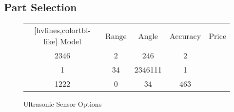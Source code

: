 \subsection{Part Selection}


\begin{figure}[h]
	\centering
	\setlength{\tabcolsep}{11pt} %
	\renewcommand{\arraystretch}{2} %
	\begin{NiceTabular}{ccccc}[hvlines,colortbl-like]
		\CodeBefore
		\columncolor{}{}
		\Body
		Model & Range & Angle & Accuracy & Price\\
		2346 & 2 & 246  & 2 & \\
		1 & 34 & 2346111 & 1 & \\
		1222 & 0 & 34 & 463
	\end{NiceTabular}
	\caption{\label{fig:compareUltrasonic}Ultrasonic Sensor Options}
\end{figure}